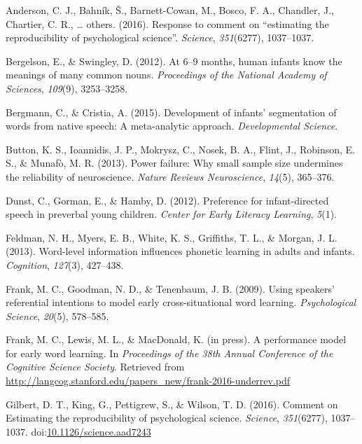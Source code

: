 \documentclass[english,floatsintext,man]{apa6}
\begin{document}
\hypertarget{refs}{}
\hypertarget{ref-anderson2016response}{}
Anderson, C. J., Bahník, Š., Barnett-Cowan, M., Bosco, F. A., Chandler,
J., Chartier, C. R., \ldots{} others. (2016). Response to comment on
``estimating the reproducibility of psychological science''.
\emph{Science}, \emph{351}(6277), 1037--1037.

\hypertarget{ref-bergelson2016}{}
Bergelson, E., \& Swingley, D. (2012). At 6--9 months, human infants
know the meanings of many common nouns. \emph{Proceedings of the
National Academy of Sciences}, \emph{109}(9), 3253--3258.

\hypertarget{ref-bergmann2015development}{}
Bergmann, C., \& Cristia, A. (2015). Development of infants'
segmentation of words from native speech: A meta-analytic approach.
\emph{Developmental Science}.

\hypertarget{ref-button2013power}{}
Button, K. S., Ioannidis, J. P., Mokrysz, C., Nosek, B. A., Flint, J.,
Robinson, E. S., \& Munafò, M. R. (2013). Power failure: Why small
sample size undermines the reliability of neuroscience. \emph{Nature
Reviews Neuroscience}, \emph{14}(5), 365--376.

\hypertarget{ref-dunst2012preference}{}
Dunst, C., Gorman, E., \& Hamby, D. (2012). Preference for
infant-directed speech in preverbal young children. \emph{Center for
Early Literacy Learning}, \emph{5}(1).

\hypertarget{ref-feldman2013word}{}
Feldman, N. H., Myers, E. B., White, K. S., Griffiths, T. L., \& Morgan,
J. L. (2013). Word-level information influences phonetic learning in
adults and infants. \emph{Cognition}, \emph{127}(3), 427--438.

\hypertarget{ref-frank2009using}{}
Frank, M. C., Goodman, N. D., \& Tenenbaum, J. B. (2009). Using
speakers' referential intentions to model early cross-situational word
learning. \emph{Psychological Science}, \emph{20}(5), 578--585.

\hypertarget{ref-frank2016performance}{}
Frank, M. C., Lewis, M. L., \& MacDonald, K. (in press). A performance
model for early word learning. In \emph{Proceedings of the 38th Annual
Conference of the Cognitive Science Society}. Retrieved from
\url{http://langcog.stanford.edu/papers_new/frank-2016-underrev.pdf}

\hypertarget{ref-Gilbert1037}{}
Gilbert, D. T., King, G., Pettigrew, S., \& Wilson, T. D. (2016).
Comment on Estimating the reproducibility of psychological science.
\emph{Science}, \emph{351}(6277), 1037--1037.
doi:\href{https://doi.org/10.1126/science.aad7243}{10.1126/science.aad7243}
\end{document}
